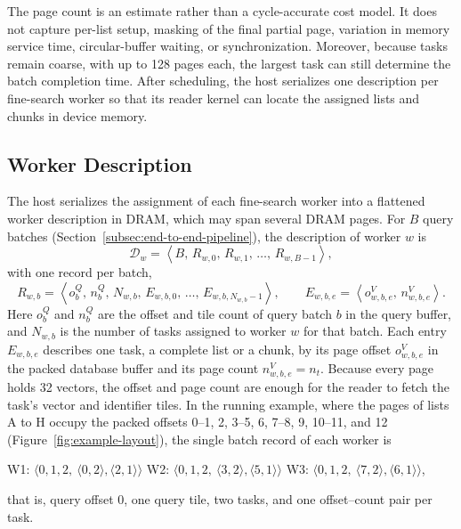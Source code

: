 The page count is an estimate rather than a cycle-accurate cost model. It does not capture per-list setup, masking of the final partial page, variation in memory service time, circular-buffer waiting, or synchronization. Moreover, because tasks remain coarse, with up to 128 pages each, the largest task can still determine the batch completion time. After scheduling, the host serializes one description per fine-search worker so that its reader kernel can locate the assigned lists and chunks in device memory.

\subsection{Worker Description}
\label{subsec:worker-description}

The host serializes the assignment of each fine-search worker into a
flattened worker description in DRAM, which may span several DRAM pages. For
\(B\) query batches (Section~\ref{subsec:end-to-end-pipeline}), the
description of worker \(w\) is
\begin{equation}
\mathcal{D}_w=\left\langle B,\,R_{w,0},\,R_{w,1},\,\ldots,\,R_{w,B-1}\right\rangle,
\label{eq:worker-description}
\end{equation}
with one record per batch,
\begin{equation}
R_{w,b}=\left\langle o^{Q}_b,\,n^{Q}_b,\,N_{w,b},\,
E_{w,b,0},\,\ldots,\,E_{w,b,N_{w,b}-1}\right\rangle,
\qquad
E_{w,b,e}=\left\langle o^{V}_{w,b,e},\,n^{V}_{w,b,e}\right\rangle.
\label{eq:worker-batch-record}
\end{equation}
Here \(o^{Q}_b\) and \(n^{Q}_b\) are the offset and tile count of query batch
\(b\) in the query buffer, and \(N_{w,b}\) is the number of tasks assigned to
worker \(w\) for that batch. Each entry \(E_{w,b,e}\) describes one task, a
complete list or a chunk, by its page offset \(o^{V}_{w,b,e}\) in the packed
database buffer and its page count \(n^{V}_{w,b,e}=n_t\). Because every page
holds 32 vectors, the offset and page count are enough for the reader to fetch
the task's vector and identifier tiles. In the running example, where the pages of lists A to H occupy the packed offsets 0--1, 2, 3--5, 6, 7--8, 9, 10--11, and 12 (Figure~\ref{fig:example-layout}), the single batch record of each worker is
\begin{center}
\small
W1: \(\langle 0,1,2,\ \langle0,2\rangle,\langle2,1\rangle\rangle\)\qquad
W2: \(\langle 0,1,2,\ \langle3,2\rangle,\langle5,1\rangle\rangle\)\qquad
W3: \(\langle 0,1,2,\ \langle7,2\rangle,\langle6,1\rangle\rangle\),
\end{center}
that is, query offset 0, one query tile, two tasks, and one offset--count pair per task.

